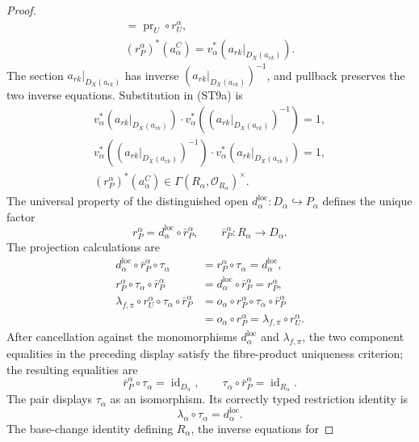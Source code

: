 \begin{proof}
\[\begin{gathered}
      =\operatorname{pr}_U\circ r_U^\alpha,\\
    (r_P^\alpha)^*(a^C_\alpha)
      =v_\alpha^*(a_{rk}|_{D_X(a_{rk})}).
  \end{gathered}                                                   \tag{ST9a}
  \]
  The section $a_{rk}|_{D_X(a_{rk})}$ has inverse
  $(a_{rk}|_{D_X(a_{rk})})^{-1}$, and pullback preserves the two inverse
  equations.  Substitution in (ST9a) is
  \[
  \begin{gathered}
    v_\alpha^*(a_{rk}|_{D_X(a_{rk})})
      \cdot v_\alpha^*((a_{rk}|_{D_X(a_{rk})})^{-1})=1,\\
    v_\alpha^*((a_{rk}|_{D_X(a_{rk})})^{-1})
      \cdot v_\alpha^*(a_{rk}|_{D_X(a_{rk})})=1,\\
    (r_P^\alpha)^*(a^C_\alpha)
      \in\Gamma(R_\alpha,\mathcal O_{R_\alpha})^\times.
  \end{gathered}
  \]
  The universal property of the
  distinguished open $d^{\mathrm{loc}}_\alpha\colon D_\alpha\hookrightarrow
  P_\alpha$ defines the unique factor
  \[
    r_P^\alpha=d^{\mathrm{loc}}_\alpha\circ\bar r_P^\alpha,
    \qquad
    \bar r_P^\alpha\colon R_\alpha\to D_\alpha.
  \]
  The projection calculations are
  \[
  \begin{aligned}
    d^{\mathrm{loc}}_\alpha\circ\bar r_P^\alpha\circ\tau_\alpha
      &=r_P^\alpha\circ\tau_\alpha
       =d^{\mathrm{loc}}_\alpha,\\
    r_P^\alpha\circ\tau_\alpha\circ\bar r_P^\alpha
      &=d^{\mathrm{loc}}_\alpha\circ\bar r_P^\alpha=r_P^\alpha,\\
    \lambda_{f,\pi}\circ r_U^\alpha\circ\tau_\alpha\circ
      \bar r_P^\alpha
      &=o_\alpha\circ r_P^\alpha\circ\tau_\alpha\circ
        \bar r_P^\alpha\\
      &=o_\alpha\circ r_P^\alpha
       =\lambda_{f,\pi}\circ r_U^\alpha.
  \end{aligned}
  \]
  After cancellation against the monomorphisms
  $d^{\mathrm{loc}}_\alpha$ and $\lambda_{f,\pi}$, the two component
  equalities in the preceding display satisfy the fibre-product uniqueness
  criterion; the resulting equalities are
  \[
    \bar r_P^\alpha\circ\tau_\alpha=\operatorname{id}_{D_\alpha},
    \qquad
    \tau_\alpha\circ\bar r_P^\alpha=\operatorname{id}_{R_\alpha}.
  \]
  The pair displays $\tau_\alpha$ as an isomorphism.  Its correctly typed
  restriction identity is
  \[
    \lambda_\alpha\circ\tau_\alpha=d^{\mathrm{loc}}_\alpha.   \tag{ST10}
  \]
  The base-change identity defining $R_\alpha$, the inverse equations for

\end{proof}
